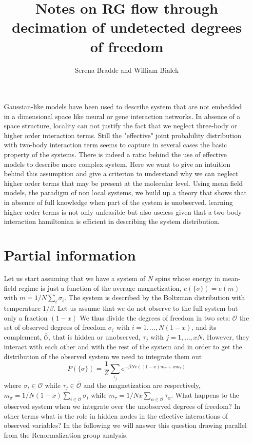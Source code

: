 \documentclass[aps,pre,noshowpacs]{revtex4}
\begin{document}
\title{Notes on RG flow through decimation of undetected degrees of freedom}

\author{Serena Bradde and William Bialek}
\maketitle

Gaussian-like models have been used to describe system that are not embedded in a dimensional space
like neural or gene interaction networks.
In absence of a space structure, locality can not justify the fact that we neglect three-body or higher order interaction terms. Still the "effective" 
joint probability distribution with two-body interaction term seems to capture in several cases the basic property of the systems. 
There is indeed a ratio behind the use of effective models to describe more complex system.
Here we want to give an intuition behind this assumption and give a criterion to understand why we can neglect higher order terms
that may be present at the molecular level. Using mean field models, the paradigm of non local systems, we build up a theory that shows that in absence of full knowledge
when part of the system is unobserved, learning higher order terms is not only unfeasible but also useless given that a two-body interaction hamiltonian is efficient in describing the 
system distribution. 

\section{Partial information}
Let us start assuming that we have a system of $N$ spins whose energy in mean-field regime is just a function of the average magnetization, $e(\{\sigma \})=e(m)$ with $m=1/N\sum_i \sigma_i$.
The system is described by the Boltzman distribution with temperature $1/\beta$. Let us assume that we do not observe to the full system but only a fraction $(1-x)$
We thus divide the degrees of freedom in two sets: $\mathcal{O}$ the set of observed degrees of freedom $\sigma_i$ with $i=1,\ldots , N (1-x)$, and its complement, $\overline{\mathcal{O}}$, that is hidden or unobserved, $\tau_j$ with $j=1,\ldots, xN$. However, they interact with each other and with the rest of the system and in order to get the distribution of the observed system we need to integrate them out
\begin{equation}
P(\{\sigma\})=\frac{1}{Z}  \sum_{\tau_j } e^{-\beta N e( (1-x) m_\sigma + x m_\tau)}
\end{equation}
where $\sigma_i \in \mathcal{O}$ while $\tau_j \in \overline{\mathcal{O}}$ and the magnetization are respectively, $m_\sigma=1/N(1-x)\sum_{i\in\mathcal{O}} \sigma_i$ while
$m_\tau=1/Nx\sum_{\alpha \in \overline{\mathcal{O}}} \tau_\alpha$.
What happens to the observed system when we integrate over the unobserved degrees of freedom? In other terms what is the role in hidden nodes in the effective interactions of observed variables? 
In the following we will answer this question drawing parallel from the Renormalization group analysis.
\end{document}
